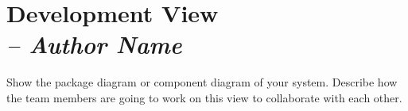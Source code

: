 \chapter{Development View \\
\small{\textit{-- Author Name}}
\label{Chapter::DevelopmentView}}

Show the package diagram or component diagram of your system. Describe how the team
members are going to work on this view to collaborate with each other.
